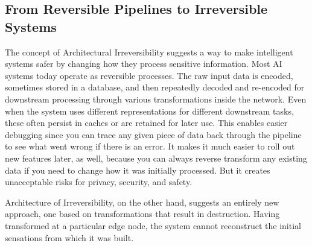 \documentclass[conference]{IEEEtran}
\begin{document}
\subsection{From Reversible Pipelines to Irreversible Systems}
The concept of Architectural Irreversibility suggests a way to make intelligent systems safer by changing how they process sensitive information. Most AI systems today operate as reversible processes. The raw input data is encoded, sometimes stored in a database, and then repeatedly decoded and re-encoded for downstream processing through various transformations inside the network. Even when the system uses different representations for different downstream tasks, these often persist in caches or are retained for later use. This enables easier debugging since you can trace any given piece of data back through the pipeline to see what went wrong if there is an error. It makes it much easier to roll out new features later, as well, because you can always reverse transform any existing data if you need to change how it was initially processed. But it creates unacceptable risks for privacy, security, and safety.

Architecture of Irreversibility, on the other hand, suggests an entirely new approach, one based on transformations that result in destruction. Having transformed at a particular edge node, the system cannot reconstruct the initial sensations from which it was built.
\end{document}
